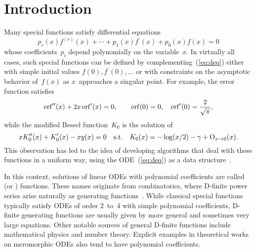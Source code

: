 \documentclass[runningheads,a4paper]{llncs}
\begin{document}
\section{Introduction}

Many special functions satisfy differential equations
\begin{equation}
  p_r (x) f^{(r)} (x) + \cdots + p_1 (x) f^{\prime} (x) + p_0 (x) f (x) = 0
  \label{eq:deq}
\end{equation}
whose coefficients~$p_i$ depend polynomially on the variable~$x$. In virtually
all cases, such special functions can be defined by
complementing~(\ref{eq:deq}) either with simple initial values $f (0),
f^{\prime} (0), \ldots$ or with constraints on the asymptotic behavior of~$f
(x)$ as $x$~approaches a singular point. For example, the error function
satisfies
\begin{equation}
  \operatorname{erf}^{\prime\prime} (x) + 2 x \operatorname{erf}^{\prime} (x) = 0,
  \hspace{2em} \operatorname{erf} (0) = 0, \hspace{1em} \operatorname{erf}^{\prime} (0) =
  \frac{2}{\sqrt{\pi}}, \label{eq:erf}
\end{equation}
while the modified Bessel function~$K_0$ is the solution of
\begin{equation}
  xK_0^{\prime\prime} (x) + K_0^{\prime} (x) - xy (x) = 0 \hspace{1em}
  \text{s.t.} \hspace{1em} K_0 (x) = - \log (x / 2) - \gamma + \mathrm{O}_{x
  \rightarrow 0} (x) . \label{eq:Bessel}
\end{equation}
This observation has led to the idea of developing algorithms that deal with
these functions in a uniform way, using the ODE~(\ref{eq:deq}) as a data
structure~{\cite{Lanczos1956,BenoitChyzakDarrasseGerholdMezzarobbaSalvy2010}}.

In this context, solutions of linear ODEs with polynomial coefficients are
called {} (or {}) functions. These names
originate from combinatorics, where D-finite power series arise naturally as
generating functions~{\cite{Stanley1999,FlajoletSedgewick2009}}. While
classical special functions typically satisfy ODEs of order 2~to~4 with simple
polynomial coefficients, D-finite generating functions are usually given by
more general and sometimes very large equations. Other notable sources of
general D-finite functions include mathematical physics and number theory.
Explicit examples in theoretical works on meromorphic ODEs also tend to have
polynomial coefficients.
\end{document}
